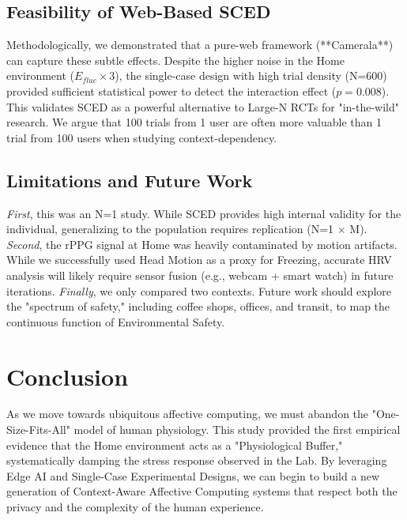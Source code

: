 \documentclass[journal]{IEEEtran}
\begin{document}
\subsection{Feasibility of Web-Based SCED}
Methodologically, we demonstrated that a pure-web framework (**Camerala**) can capture these subtle effects.
Despite the higher noise in the Home environment ($E_{fluc} \times 3$), the single-case design with high trial density (N=600) 
provided sufficient statistical power to detect the interaction effect ($p=0.008$).
This validates SCED as a powerful alternative to Large-N RCTs for "in-the-wild" research. 
We argue that 100 trials from 1 user are often more valuable than 1 trial from 100 users when studying context-dependency.

\subsection{Limitations and Future Work}
\textit{First}, this was an N=1 study. While SCED provides high internal validity for the individual, generalizing to the population requires replication (N=1 $\times$ M).
\textit{Second}, the rPPG signal at Home was heavily contaminated by motion artifacts. 
While we successfully used Head Motion as a proxy for Freezing, accurate HRV analysis will likely require sensor fusion (e.g., webcam + smart watch) in future iterations.
\textit{Finally}, we only compared two contexts. Future work should explore the "spectrum of safety," including coffee shops, offices, and transit, 
to map the continuous function of Environmental Safety.

\section{Conclusion}
As we move towards ubiquitous affective computing, we must abandon the "One-Size-Fits-All" model of human physiology. 
This study provided the first empirical evidence that the Home environment acts as a "Physiological Buffer," systematically damping the stress response 
observed in the Lab. By leveraging Edge AI and Single-Case Experimental Designs, we can begin to build a new generation of 
Context-Aware Affective Computing systems that respect both the privacy and the complexity of the human experience.





\end{document}
